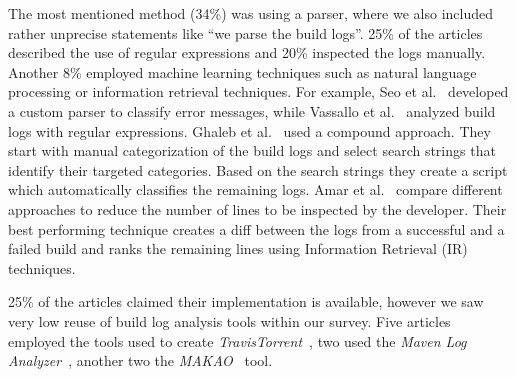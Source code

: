 The most mentioned method (34\%) was using a parser, where we also
included
rather unprecise statements like ``we parse the build logs''.
25\% of the articles described the use of regular expressions and 20\%
inspected the logs manually.
Another 8\% employed machine learning techniques such as natural language
processing or information retrieval techniques.
For example,
Seo et al.~\cite{seo2014programmers} developed a custom
parser to classify error messages, while Vassallo et
al.~\cite{vassallo2017a-tale} analyzed build logs with regular
expressions.
Ghaleb et al.~\cite{ghaleb2019studying} used a compound approach.
They start with manual categorization of the build logs and select
search strings that identify their targeted categories.
Based on the search strings they create a script which automatically
classifies the remaining logs.
Amar et al.~\cite{amar2019mining} compare different approaches to
reduce the number of lines to be inspected by the developer.
Their best performing technique creates a diff between the logs from a
successful and a failed build and ranks the remaining lines using
Information Retrieval (IR) techniques.

25\% of the articles claimed their implementation is available, however we
saw very low reuse of build log analysis tools within our survey.
Five articles employed the tools used to create
\emph{TravisTorrent}~\cite{beller2017travistorrent}, two used the
\emph{Maven Log Analyzer}~\cite{macho2018automatically,gallaba2018noise},
another two the
\emph{MAKAO}~\cite{wen2018blimp,adams2007design,adams2007makao} tool.






